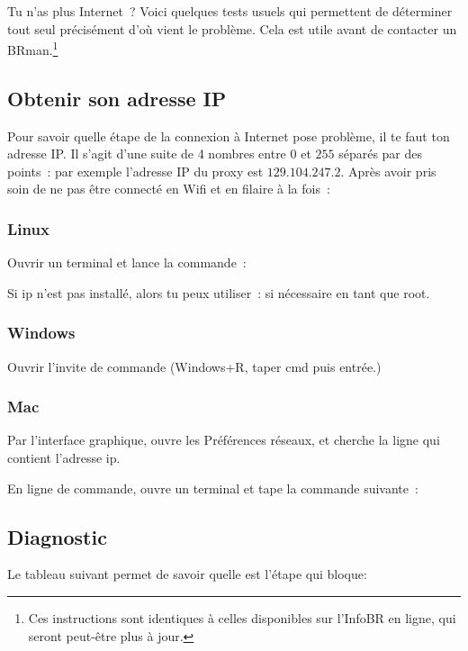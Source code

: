 \label{diagnostic}
Tu n'as plus Internet~? Voici quelques tests usuels qui permettent de déterminer tout seul précisément d'où vient le problème. Cela est utile avant de contacter un BRman.\footnote{Ces instructions sont identiques à celles disponibles sur l'InfoBR en ligne, qui seront peut-être plus à jour.}

\subsection{Obtenir son adresse IP}
Pour savoir quelle étape de la connexion à Internet pose problème, il te faut ton adresse IP. Il s'agit d'une suite de 4 nombres entre $0$ et $255$ séparés par des points~: par exemple l'adresse IP du proxy est $129.104.247.2$. Après avoir pris soin de ne pas être connecté en Wifi et en filaire à la fois~:

\subsubsection{Linux}
Ouvrir un terminal et lance la commande~:

Si ip n'est pas installé, alors tu peux utiliser~:
si nécessaire en tant que root.

\subsubsection{Windows}
Ouvrir l'invite de commande (Windows+R, taper cmd puis entrée.)

\subsubsection{Mac}
Par l'interface graphique, 
ouvre les Préférences réseaux, et cherche la ligne qui contient l'adresse ip.

En ligne de commande,
ouvre un terminal et tape la commande suivante~:

\subsection{Diagnostic}
Le tableau suivant permet de savoir quelle est l'étape qui bloque:

